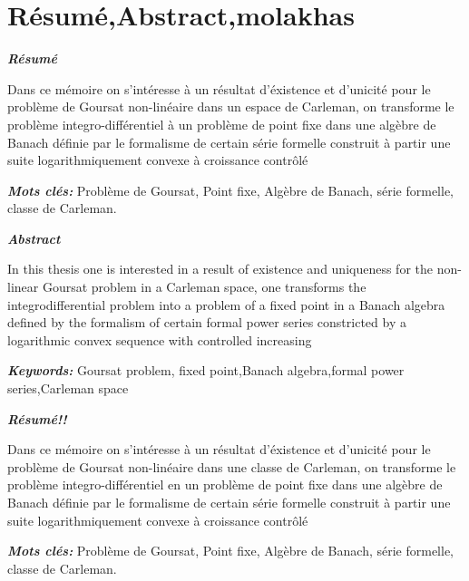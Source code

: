 



\chapter*{Résumé,Abstract,molakhas}
\begin{center}
\textbf{\textit{Résumé}}
\end{center}

Dans ce mémoire on s'intéresse à un résultat d'éxistence et d'unicité pour le problème de Goursat non-linéaire dans un espace de Carleman, on transforme le problème integro-différentiel à un problème de point fixe dans une algèbre de Banach définie par le formalisme de certain série formelle construit à partir une suite logarithmiquement convexe à croissance contrôlé 

\textbf{\textit{Mots clés:}} Problème de Goursat, Point fixe, Algèbre de Banach, série formelle, classe de Carleman.
\begin{center}
\textbf{\textit{Abstract}}
\end{center}
In this thesis one is interested in a result of existence and uniqueness for the non-linear Goursat problem in a Carleman space, one transforms the integrodifferential problem into a problem of a fixed point in a Banach algebra defined by the formalism of certain formal power series constricted  by a logarithmic convex sequence with controlled increasing

\textbf{\textit{Keywords:}} Goursat problem, fixed point,Banach algebra,formal power series,Carleman space

\begin{center}
\textbf{\textit{Résumé!!}}
\end{center}

Dans ce mémoire on s'intéresse à un résultat d'éxistence et d'unicité pour le problème de Goursat non-linéaire dans une classe de Carleman, on transforme le problème integro-différentiel en un problème de point fixe dans une algèbre de Banach définie par le formalisme de certain série formelle construit à partir une suite logarithmiquement convexe à croissance contrôlé 

\textbf{\textit{Mots clés:}} Problème de Goursat, Point fixe, Algèbre de Banach, série formelle, classe de Carleman.




